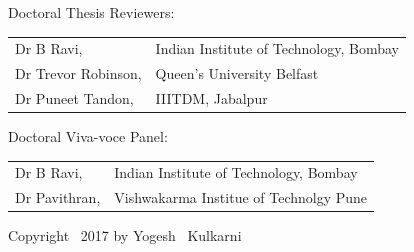 \begin{titlepage}
\medskip
\noindent  Doctoral Thesis Reviewers:

\medskip\noindent
\begin{tabular}{ll}
    Dr B Ravi, & Indian Institute of Technology, Bombay\\
    Dr Trevor Robinson, & Queen's University Belfast \\
    Dr Puneet Tandon, & IIITDM, Jabalpur
\end{tabular}

\medskip
\noindent  Doctoral Viva-voce Panel:

\noindent
\begin{tabular}{ll}
    Dr B Ravi, & Indian Institute of Technology, Bombay\\
    Dr Pavithran, & Vishwakarma Institue of Technolgy Pune 
\end{tabular}

\medskip



\noindent

\vspace{25\bigskipamount}

\noindent Copyright \textcopyright\ 2017 by Yogesh ~Kulkarni




\end{titlepage}

